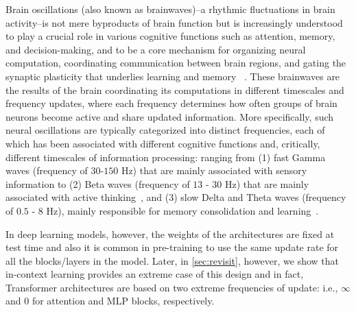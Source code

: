 \documentclass{article}
\newcommand{\citep}{\parencite}
\newcommand{\head}[1]{\vspace{1.7mm}\noindent{{\textcolor{c4}{\bf #1.}}}}
\begin{document}
\head{Multi Time scale Processing System} Brain oscillations (also known as brainwaves)–a rhythmic fluctuations in brain activity–is not mere byproducts of brain function but is increasingly understood to play a crucial role in various cognitive functions such as attention, memory, and decision-making, and to be a core mechanism for organizing neural computation, coordinating communication between brain regions, and gating the synaptic plasticity that underlies learning and memory ~\citep{fries2015rhythms, fell2011role, cavanagh2014frontal}. These brainwaves are the results of the brain coordinating its computations in different timescales and frequency updates, where each frequency determines how often groups of brain neurons become active and share updated information.
More specifically, such neural oscillations are typically categorized into distinct frequencies, each of which has been associated with different cognitive functions and, critically, different timescales of information processing: ranging from (1) fast Gamma waves (frequency of $30$-$150$ Hz) that are mainly associated with sensory information to (2) Beta waves (frequency of $13$ - $30$ Hz) that are mainly associated with active thinking~\citep{buzsaki2004neuronal,BuschmanMiller2007Science,Lundqvist2016Neuron}, and (3) slow Delta and Theta waves (frequency of $0.5$ - $8$ Hz), mainly responsible for memory consolidation and learning~\citep{DiekelmannBorn2010NRN,Marshall2006Nature,Ngo2013Neuron,Staresina2015NatNeuro,Heusser2016NatNeuro,Daume2024Nature}. 

In deep learning models, however, the weights of the architectures are fixed at test time and also it is common in pre-training to use the same update rate for all the blocks/layers in the model. Later, in \autoref{sec:revisit}, however, we show that in-context learning provides an extreme case of this design and in fact, Transformer architectures are based on two extreme frequencies of update: i.e., $\infty$ and $0$ for attention and MLP blocks, respectively.   
\end{document}
